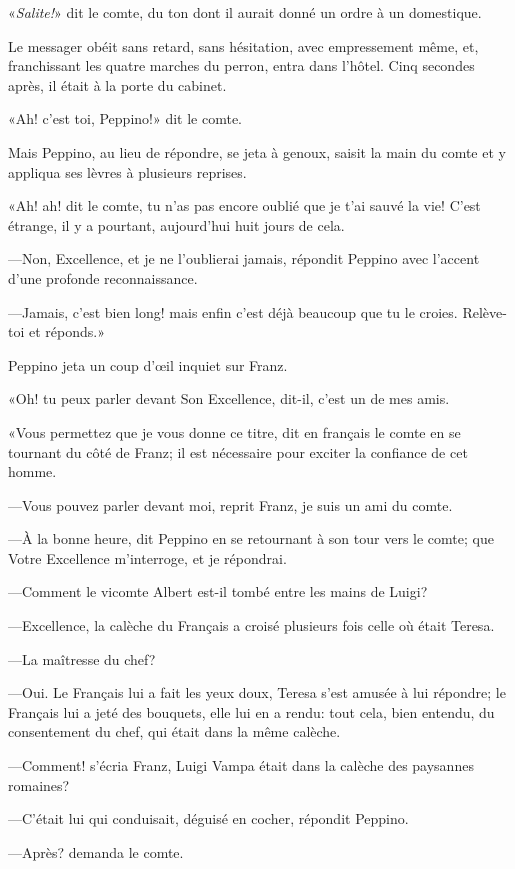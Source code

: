 «\textit{Salite!}» dit le comte, du ton dont il aurait donné un ordre à un domestique. 

Le messager obéit sans retard, sans hésitation, avec empressement même, et, franchissant les quatre marches du perron, entra dans l'hôtel. Cinq secondes après, il était à la porte du cabinet. 

«Ah! c'est toi, Peppino!» dit le comte. 

Mais Peppino, au lieu de répondre, se jeta à genoux, saisit la main du comte et y appliqua ses lèvres à plusieurs reprises.  

«Ah! ah! dit le comte, tu n'as pas encore oublié que je t'ai sauvé la vie! C'est étrange, il y a pourtant, aujourd'hui huit jours de cela. 

—Non, Excellence, et je ne l'oublierai jamais, répondit Peppino avec l'accent d'une profonde reconnaissance. 

—Jamais, c'est bien long! mais enfin c'est déjà beaucoup que tu le croies. Relève-toi et réponds.» 

Peppino jeta un coup d'œil inquiet sur Franz. 

«Oh! tu peux parler devant Son Excellence, dit-il, c'est un de mes amis. 

«Vous permettez que je vous donne ce titre, dit en français le comte en se tournant du côté de Franz; il est nécessaire pour exciter la confiance de cet homme. 

—Vous pouvez parler devant moi, reprit Franz, je suis un ami du comte. 

—À la bonne heure, dit Peppino en se retournant à son tour vers le comte; que Votre Excellence m'interroge, et je répondrai. 

—Comment le vicomte Albert est-il tombé entre les mains de Luigi? 

—Excellence, la calèche du Français a croisé plusieurs fois celle où était Teresa. 

—La maîtresse du chef? 

—Oui. Le Français lui a fait les yeux doux, Teresa s'est amusée à lui répondre; le Français lui a jeté des bouquets, elle lui en a rendu: tout cela, bien entendu, du consentement du chef, qui était dans la même calèche. 

—Comment! s'écria Franz, Luigi Vampa était dans la calèche des paysannes romaines? 

—C'était lui qui conduisait, déguisé en cocher, répondit Peppino.  

—Après? demanda le comte. 


